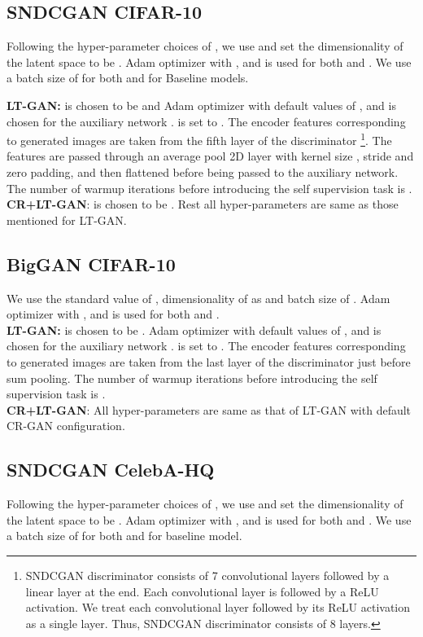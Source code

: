 \documentclass[10pt,twocolumn,letterpaper]{article}
\begin{document}
\subsection{SNDCGAN CIFAR-10} 
Following the hyper-parameter choices of \cite{crgan2019chen}, we use  and set the dimensionality of the latent space to be . Adam optimizer with ,  and  is used for both  and . We use a batch size of  for both  and  for Baseline models. 

\textbf{LT-GAN:}
 is chosen to be  and Adam optimizer with default values of ,  and  is chosen for the auxiliary network .  is set to . The encoder features  corresponding to generated images  are taken from the fifth layer of the discriminator \footnote{SNDCGAN discriminator consists of 7 convolutional layers followed by a linear layer at the end. Each convolutional layer is followed by a ReLU activation. We treat each convolutional layer followed by its ReLU activation as a single layer. Thus, SNDCGAN discriminator consists of 8 layers.}. The features  are passed through an average pool 2D layer with kernel size , stride  and zero padding, and then flattened before being passed to the auxiliary network. The number of warmup iterations  before introducing the self supervision task is . 
\\

\textbf{CR+LT-GAN}:
 is chosen to be . Rest all hyper-parameters are same as those mentioned for LT-GAN.


\subsection{BigGAN CIFAR-10}
We use the standard value\cite
{biggan2018brock} of , dimensionality of  as  and batch size of . Adam optimizer with ,  and  is used for both  and .\\
\vspace{-2pt}
\indent \textbf{LT-GAN:}
 is chosen to be . Adam optimizer with default values of ,  and  is chosen for the auxiliary network .  is set to . The encoder features  corresponding to generated images  are taken from the last layer of the discriminator just before sum pooling. The number of warmup iterations  before introducing the self supervision task is . 
\\
\indent \textbf{CR+LT-GAN}: All hyper-parameters are same as that of LT-GAN with default CR-GAN configuration.


\subsection{SNDCGAN CelebA-HQ} 
Following the hyper-parameter choices of \cite{crgan2019chen}, we use  and set the dimensionality of the latent space to be . Adam optimizer with ,  and  is used for both  and . We use a batch size of  for both  and  for baseline model.
\end{document}
